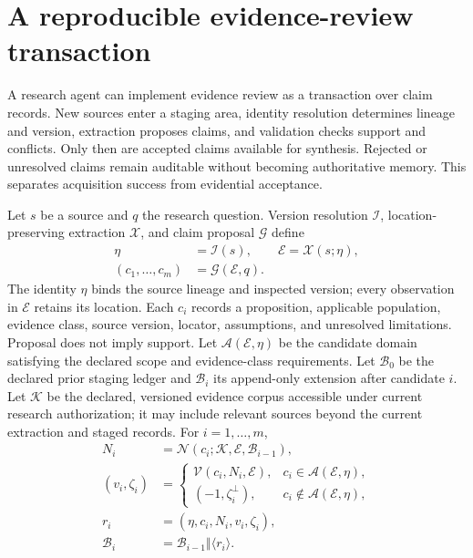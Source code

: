 \section{A reproducible evidence-review transaction}\label{sec:C24:transaction}
A research agent can implement evidence review as a transaction over claim records. New sources enter a staging area, identity resolution determines lineage and version, extraction proposes claims, and validation checks support and conflicts. Only then are accepted claims available for synthesis. Rejected or unresolved claims remain auditable without becoming authoritative memory. This separates acquisition success from evidential acceptance.

Let $s$ be a source and $q$ the research question. Version resolution $\mathcal I$, location-preserving extraction $\mathcal X$, and claim proposal $\mathcal G$ define
\begin{equation}
\begin{aligned}
 \eta&=\mathcal I(s),\qquad
 \mathcal E=\mathcal X(s;\eta),\\
 (c_1,\ldots,c_m)&=\mathcal G(\mathcal E,q).
\end{aligned}
\label{eq:C24:evidence_candidates}
\end{equation}
The identity $\eta$ binds the source lineage and inspected version; every observation in $\mathcal E$ retains its location. Each $c_i$ records a proposition, applicable population, evidence class, source version, locator, assumptions, and unresolved limitations. Proposal does not imply support. Let $\mathcal A(\mathcal E,\eta)$ be the candidate domain satisfying the declared scope and evidence-class requirements. Let $\mathcal B_0$ be the declared prior staging ledger and $\mathcal B_i$ its append-only extension after candidate $i$. Let $\mathcal K$ be the declared, versioned evidence corpus accessible under current research authorization; it may include relevant sources beyond the current extraction and staged records. For $i=1,\ldots,m$,
\begin{equation}
\begin{aligned}
 N_i&=\mathcal N(c_i;\mathcal K,\mathcal E,\mathcal B_{i-1}),\\
 (v_i,\zeta_i)&=
 \begin{cases}
  \mathcal V(c_i,N_i,\mathcal E),&c_i\in\mathcal A(\mathcal E,\eta),\\
  (-1,\zeta_i^{\perp}),&c_i\notin\mathcal A(\mathcal E,\eta),
 \end{cases}\\
 r_i&=(\eta,c_i,N_i,v_i,\zeta_i),\\
 \mathcal B_i&=\mathcal B_{i-1}\mathbin{\Vert}\langle r_i\rangle.
\end{aligned}
\label{eq:C24:staged_evidence_audit}
\end{equation}
